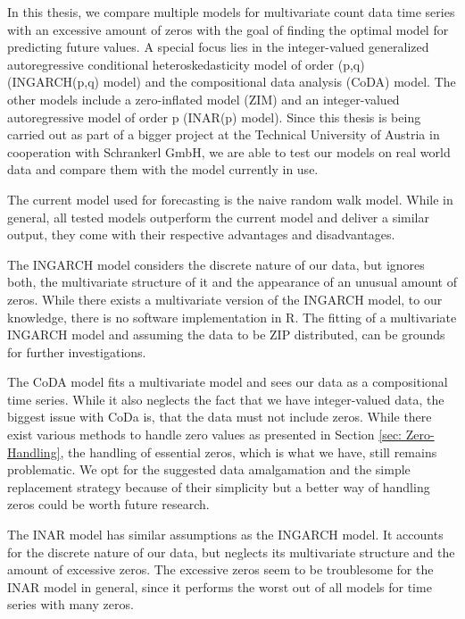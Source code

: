 In this thesis, we compare multiple models for multivariate count data time series with an excessive amount of zeros with the goal of finding the optimal model for predicting future values. A special focus lies in the integer-valued generalized autoregressive conditional heteroskedasticity model of order (p,q) (INGARCH(p,q) model) and the compositional data analysis (CoDA) model. The other models include a zero-inflated model (ZIM) and an integer-valued autoregressive model of order p (INAR(p) model). Since this thesis is being carried out as part of a bigger project at the Technical University of Austria in cooperation with Schrankerl GmbH, we are able to test our models on real world data and compare them with the model currently in use. 

The current model used for forecasting is the naive random walk model. While in general, all tested models outperform the current model and deliver a similar output, they come with their respective advantages and disadvantages.

The INGARCH model considers the discrete nature of our data, but ignores both, the multivariate structure of it and the appearance of an unusual amount of zeros. While there exists a multivariate version of the INGARCH model, to our knowledge, there is no software implementation in R. The fitting of a multivariate INGARCH model and assuming the data to be ZIP distributed, can be grounds for further investigations. %

The CoDA model fits a multivariate model and sees our data as a compositional time series. While it also neglects the fact that we have integer-valued data, the biggest issue with CoDa is, that the data must not include zeros. While there exist various methods to handle zero values as presented in Section \ref{sec: Zero-Handling}, the handling of essential zeros, which is what we have, still remains problematic. We opt for the suggested data amalgamation and the simple replacement strategy because of their simplicity but a better way of handling zeros could be worth future research. 

The INAR model has similar assumptions as the INGARCH model. It accounts for the discrete nature of our data, but neglects its multivariate structure and the amount of excessive zeros. The excessive zeros seem to be troublesome for the INAR model in general, since it performs the worst out of all models for time series with many zeros. 

